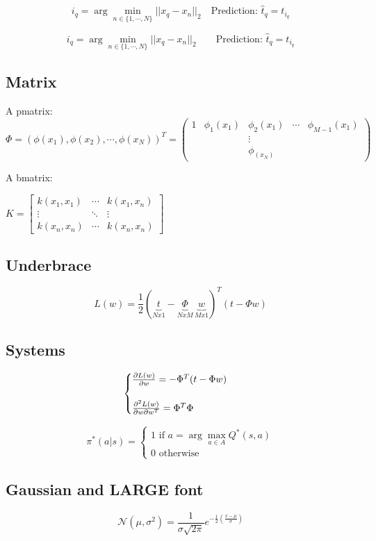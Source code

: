 $$i_q=\arg\min_{n\in\{1,\cdots,N\}}||x_q-x_n||_2\hspace{1em}\text{Prediction: }\hat{t}_q=t_{i_q}$$

$$i_q=\arg\min_{n\in\{1,\cdots,N\}}||x_q-x_n||_2\qquad\text{Prediction: }\hat{t}_q=t_{i_q}$$

\subsection{Matrix}
A pmatrix:
$$
\Phi=(\phi(x_1),\phi(x_2),\cdots,\phi(x_N))^T=
\begin{pmatrix}
    1 & \phi_1(x_1) & \phi_2(x_1) & \cdots & \phi_{M-1}(x_1) \\
    & & \vdots & & \\
    & & \phi_(x_N) & &
\end{pmatrix}
$$

A bmatrix:
\begin{center}
    $
    K=
    \begin{bmatrix}
        k(x_1,x_1) & \cdots & k(x_1,x_n) \\
        \vdots & \ddots & \vdots \\
        k(x_n,x_n) & \cdots & k(x_n,x_n)
    \end{bmatrix}
    $
\end{center}

\subsection{Underbrace}
$$L(w)=\frac{1}{2}(\underset{Nx1}{\underbrace{t}}-\underset{NxM}{\underbrace{\Phi}}\,\underset{Mx1}{\underbrace{w}})^T(t-\Phi w)$$

\subsection{Systems}
$$
\begin{cases}
    \frac{\partial L(w)}{\partial w}=-\Phi^T(t-\Phi w)\\
    \vspace{0em}\\
    \frac{\partial^2L(w)}{\partial w \partial w^T}=\Phi^T\Phi
\end{cases}
$$

$$
\pi^*(a|s)=
    \begin{cases}
        1\text{  if $a=\arg \max_{a\in A}Q^*(s,a)$}\\
        0\text{  otherwise}
    \end{cases}
$$

\subsection{Gaussian and LARGE font}
\begin{LARGE}
$$
    \mathcal{N}(\mu,\sigma^2)=\frac
    {1}{\sigma\sqrt{2\pi}}e^{
        -\frac{1}{2}\left(\frac{x-\mu}{\sigma}\right)
    }
$$
\end{LARGE}